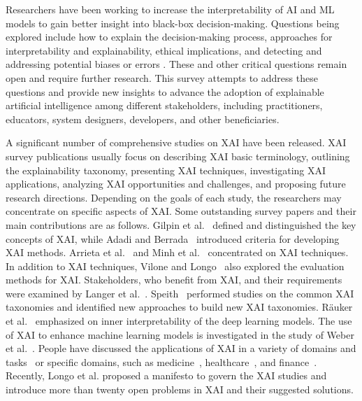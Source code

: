 \documentclass[final,5p,times,twocolumn]{elsarticle}
\begin{document}
Researchers have been working to increase the interpretability of AI and ML models to gain better insight into black-box decision-making. Questions being explored include how to explain the decision-making process, approaches for interpretability and explainability, ethical implications, and detecting and addressing potential biases or errors \cite{weller2019transparency,guidotti2018survey}. These and other critical questions remain open and require further research. This survey attempts to address these questions and provide new insights to advance the adoption of explainable artificial intelligence among different stakeholders, including practitioners, educators, system designers, developers, and other beneficiaries. 

A significant number of comprehensive studies on XAI have been released. XAI survey publications usually focus on describing XAI basic terminology, outlining the explainability taxonomy, presenting XAI techniques, investigating XAI applications, analyzing XAI opportunities and challenges, and proposing future research directions. Depending on the goals of each study, the researchers may concentrate on specific aspects of XAI. Some outstanding survey papers and their main contributions are as follows. Gilpin et al.~\cite{gilpin2018explaining} defined and distinguished the key concepts of XAI, while Adadi and Berrada~\cite{adadi2018peeking} introduced criteria for developing XAI methods. Arrieta et al.~\cite{arrieta2020explainable} and Minh et al.~\cite{minh2022explainable} concentrated on XAI techniques. In addition to XAI techniques, Vilone and Longo~\cite{vilone2020explainable} also explored the evaluation methods for XAI. Stakeholders, who benefit from XAI, and their requirements were examined by Langer et al.~\cite{langer2021we}. Speith~\cite{speith2022review} performed studies on the common XAI taxonomies and identified new approaches to build new XAI taxonomies. R\"auker et al.~\cite{rauker2023toward} emphasized on inner interpretability of the deep learning models. The use of XAI to enhance machine learning models is investigated in the study of Weber et al.~\cite{weber2023beyond}. People have discussed the applications of XAI in a variety of domains and tasks~\cite{islam2022systematic} or specific domains, such as medicine~\cite{holzinger2019causability,lotsch2021explainable,gonzalez2023scoping}, healthcare~\cite{loh2022application,alam2023explainable,albahri2023systematic,saranya2023systematic}, and finance~\cite{saranya2023systematic}. Recently, Longo et al. \cite{longo2024explainable} proposed a manifesto to govern the XAI studies and introduce more than twenty open problems in XAI and their suggested solutions. 
\end{document}
